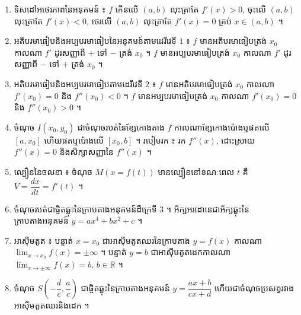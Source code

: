 \begin{note}[មេរៀនសង្ខេប]
\begin{enumerate}[1]
  \item ទិសដៅអថេរភាពនៃអនុគមន៍ ៖ $f$ កើនលើ $(a, b)$ លុះត្រាតែ $f'(x) > 0$, ចុះលើ $(a, b)$ លុះត្រាតែ $f'(x) < 0$, ថេរលើ $(a, b)$ លុះត្រាតែ $f'(x) = 0$ គ្រប់ $x \in (a, b)$ ។
  \item អតិបរមាធៀបនិងអប្បបរមាធៀបនៃអនុគមន៍តាមដេរីវេទី $1$ ៖ $f$ មានអតិបរមាធៀបត្រង់ $x_0$ កាលណា $f'$ ដូរសញ្ញាពី $+$ ទៅ $-$ ត្រង់ $x_0$ ។ $f$ មានអប្បបរមាធៀបត្រង់ $x_0$ កាលណា $f'$ ដូរសញ្ញាពី $-$ ទៅ $+$ ត្រង់ $x_0$ ។
  \item អតិបរមាធៀបនិងអប្បបរមាធៀបតាមដេរីវេទី $2$ ៖ $f$ មានអតិបរមាធៀបត្រង់ $x_0$ កាលណា $f'(x_0) = 0$ និង $f''(x_0) < 0$ ។ $f$ មានអប្បបរមាធៀបត្រង់ $x_0$ កាលណា $f'(x_0) = 0$ និង $f''(x_0) > 0$ ។
  \item ចំណុច $I(x_0, y_0)$ ជាចំណុចរបត់នៃខ្សែកោងតាង $f$ កាលណាខ្សែកោងប៉ោងឬផតលើ $[a, x_0]$ ហើយផតឬប៉ោងលើ $[x_0, b]$ ។ របៀបរក ៖ រក $f''(x)$, ដោះស្រាយ $f''(x) = 0$ និងសិក្សាសញ្ញានៃ $f''(x)$ ។
  \item ល្បឿននៃចលនា ៖ ចំណុច $M(x = f(t))$ មានល្បឿននៅខណៈពេល $t$ គឺ $V = \dfrac{dx}{dt} = f'(t)$ ។
  \item ចំណុចរបត់ជាផ្ចិតឆ្លុះនៃក្រាបតាងអនុគមន៍ដឺក្រេទី $3$ ។ អ័ក្សអរដោនេជាអ័ក្សឆ្លុះនៃក្រាបតាងអនុគមន៍ $y = ax^4 + bx^2 + c$ ។
  \item អាស៊ីមតូត ៖ បន្ទាត់ $x = x_0$ ជាអាស៊ីមតូតឈរនៃក្រាបតាង $y = f(x)$ កាលណា $\displaystyle\lim_{x \to x_0} f(x) = \pm\infty$ ។ បន្ទាត់ $y = b$ ជាអាស៊ីមតូតដេកកាលណា $\displaystyle\lim_{x \to \pm\infty} f(x) = b$, $b \in \mathbb{R}$ ។
  \item ចំណុច $S\left(-\dfrac{d}{c}, \dfrac{a}{c}\right)$ ជាផ្ចិតឆ្លុះនៃក្រាបតាងអនុគមន៍ $y = \dfrac{ax + b}{cx + d}$ ហើយជាចំណុចប្រសព្វរវាងអាស៊ីមតូតឈរនិងដេក ។
\end{enumerate}
\end{note}


